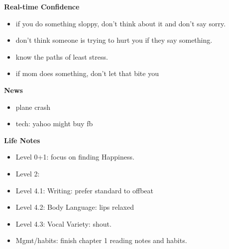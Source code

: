 \documentclass[11pt]{article}
\begin{document}
{            %
            \textbf{Real-time Confidence}\\
            \begin{itemize}
              \tiny \item \tiny if you do something sloppy, don't think about it and don't say sorry.
            \item \tiny don't think someone is trying to hurt you if they say something.
            \item \tiny know the paths of least stress.
            \item \tiny if mom does something, don't let that bite you
            \end{itemize}

            \textbf{News} 
            \begin{itemize}
            \item \tiny plane crash
            \item \tiny tech: yahoo might buy fb
            \end{itemize} 
            
            \textbf{Life Notes}
            \begin{itemize}
              \tiny \item \tiny Level 0+1: focus on finding Happiness.
            \item \tiny Level 2:
            \item \tiny Level 4.1: Writing: prefer standard to offbeat
            \item \tiny Level 4.2: Body Language: lips relaxed
            \item \tiny Level 4.3: Vocal Variety: shout.
            \item \tiny Mgmt/habits: finish chapter 1 reading notes and habits.
            \end{itemize} 
            \newpage
            
}
\end{document}

